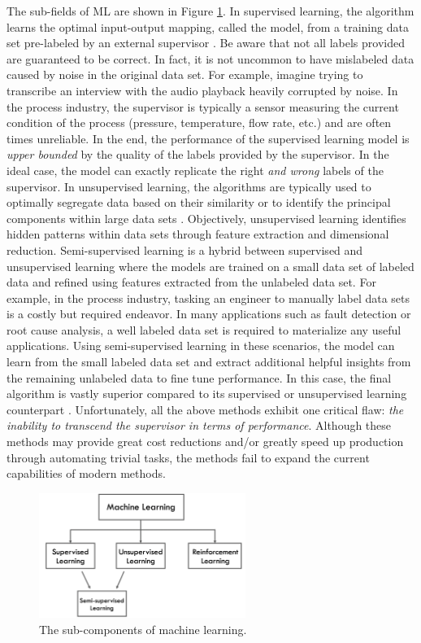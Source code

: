 The sub-fields of ML are shown in Figure \ref{fig:MLGoals}.  In supervised learning, the algorithm learns the optimal input-output mapping, called the model, from a training data set pre-labeled by an external supervisor \cite{sutton}.  Be aware that not all labels provided are guaranteed to be correct. In fact, it is not uncommon to  have mislabeled data caused by noise in the original data set. For example, imagine trying to transcribe an interview with the audio playback heavily corrupted by noise.  In the process industry, the supervisor is typically a sensor measuring the current condition of the process (pressure, temperature, flow rate, etc.) and are often times unreliable. In the end, the performance of the supervised learning model is \textit{upper bounded} by the quality of the labels provided by the supervisor.  In the ideal case, the model can exactly replicate the right \textit{and wrong} labels of the supervisor. In unsupervised learning, the algorithms are typically used to optimally segregate data based on their similarity or to identify the principal components within large data sets \cite{Hinton, sutton}.  Objectively, unsupervised learning identifies hidden patterns within data sets through feature extraction and dimensional reduction. Semi-supervised learning is a hybrid between supervised and unsupervised learning where the models are trained on a small data set of labeled data and refined using features extracted from the unlabeled data set. For example, in the process industry, tasking an engineer to manually label data sets is a costly but required endeavor.  In many applications such as fault detection or root cause analysis, a well labeled data set is required to materialize any useful applications.  Using semi-supervised learning in these scenarios, the model can learn from the small labeled data set and extract additional helpful insights from the remaining unlabeled data to fine tune performance.  In this case, the final algorithm is vastly superior compared to its supervised or unsupervised learning counterpart \cite{machine_learning}.  Unfortunately, all the above methods exhibit one critical flaw: \textit{the inability to transcend the supervisor in terms of performance}. Although these methods may provide great cost reductions and/or greatly speed up production through automating trivial tasks, the methods fail to expand the current capabilities of modern methods.

\begin{figure}[H]
    \centering
    \includegraphics[width=0.6\textwidth]{images/ch1/MLGoals.jpeg}
    \caption{The sub-components of machine learning.}
    \label{fig:MLGoals}
\end{figure}   


